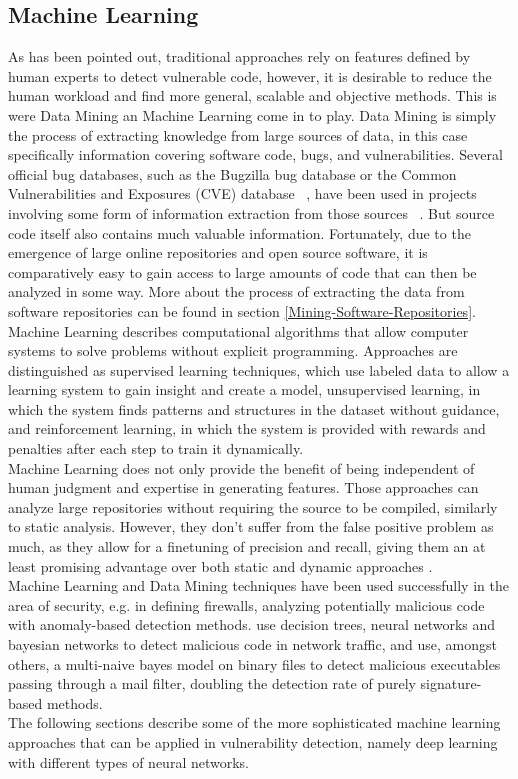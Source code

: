 \documentclass[
	a4paper,
	pagesize,
	pdftex,
	12pt,
	twoside, %
	BCOR=5mm, %
	ngerman,
	fleqn,
	final,
	]{scrartcl}
\begin{document}
\subsection{Machine Learning}
As has been pointed out, traditional approaches rely on features defined by human experts to detect vulnerable code, however, it is desirable to reduce the human workload and find more general, scalable and objective methods. This is were Data Mining an Machine Learning come in to play. Data Mining is simply the process of extracting knowledge from large sources of data, in this case specifically information covering software code, bugs, and vulnerabilities. Several official bug databases, such as the Bugzilla bug database or the Common Vulnerabilities and Exposures (CVE) database ~\cite{CVE}, have been used in projects involving some form of information extraction from those sources ~\cite{Wijayasekara.2012}. But source code itself also contains much valuable information. Fortunately, due to the emergence of large online repositories and open source software, it is comparatively easy to gain access to large amounts of code that can then be analyzed in some way. More about the process of extracting the data from software repositories can be found in section \ref{Mining-Software-Repositories}.\\
Machine Learning describes computational algorithms that allow computer systems to solve problems without explicit programming. Approaches are distinguished as supervised learning techniques, which use labeled data to allow a learning system to gain insight and create a model, unsupervised learning, in which the system finds patterns and structures in the dataset without guidance, and reinforcement learning, in which the system is provided with rewards and penalties after each step to train it dynamically.\\
Machine Learning does not only provide the benefit of being independent of human judgment and expertise in generating features. Those approaches can analyze large repositories without requiring the source to be compiled, similarly to static analysis. However, they don't suffer from the false positive problem as much, as they allow for a finetuning of precision and recall, giving them an at least promising advantage over both static and dynamic approaches \cite{Russell.2018}. \\
Machine Learning and Data Mining techniques have been used successfully in the area of security, e.g. in defining firewalls, analyzing potentially malicious code with anomaly-based detection methods. \cite{Elovici.2007} use decision trees, neural networks and bayesian networks to detect malicious code in network traffic, and \cite{Schultz.2000} use, amongst others, a multi-naive bayes model on binary files to detect malicious executables passing through a mail filter, doubling the detection rate of purely signature-based methods.\\
The following sections describe some of the more sophisticated machine learning approaches that can be applied in vulnerability detection, namely deep learning with different types of neural networks. 
\end{document}
